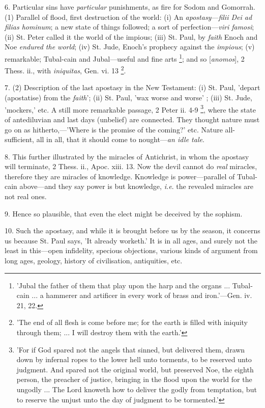 6. Particular sins have \emph{particular}
punishments, as fire for Sodom and Gomorrah. (1) Parallel of flood,
first destruction of the world: (i) An \emph{apostasy}—\emph{filii Dei
ad filias hominum}; a new state of things followed; a sort of
perfection—\emph{viri famosi}; (ii) St. Peter called it the world of
the impious; (iii) St. Paul, by \emph{faith} Enoch and Noe \emph{endured
the world}; (iv) St. Jude, Enoch's prophecy against the \emph{impious};
(v) remarkable; Tubal-cain and Jubal—useful and fine arts \footnote{'Jubal the father of
them that play upon the harp and the organs ... Tubal-cain ... a
hammerer and artificer in every work of brass and iron.'—Gen. iv.
21, 22.}; and so [\emph{anomos}], 2 Thess. ii., with \emph{iniquitas},
Gen. vi. 13 \footnote{'The end of all flesh is
come before me; for the earth is filled with iniquity through them;
... I will destroy them with the earth.'}.

7. (2) Description of the last apostasy in the
New Testament: (i) St. Paul, 'depart (apostatise) from the \emph{faith}';
(ii) St. Paul, 'wax worse and worse' ; (iii) St. Jude, 'mockers,' etc.
A still more remarkable passage, 2 Peter ii. 4-9 \footnote{'For if God spared not
the angels that sinned, but delivered them, drawn down by infernal
ropes to the lower hell unto torments, to be reserved unto judgment.
And spared not the original world, but preserved Noe, the eighth
person, the preacher of justice, bringing in the flood upon the world
for the ungodly ... The Lord knoweth how to deliver the godly from
temptation, but to reserve the unjust unto the day of judgment to be
tormented.'}, where the state of antediluvian and last days (unbelief) are
connected. They thought nature must go on as hitherto,—'Where is the
promise of the coming?' etc. Nature all-sufficient, all in all, that
it should come to nought—\emph{an idle tale}.

8. This further illustrated by the miracles of
Antichrist, in whom the apostasy will terminate, 2 Thess. ii., Apoc.
xiii. 13. Now the devil cannot do \emph{real} miracles, therefore they
are miracles of knowledge. Knowledge is power—parallel of Tubal-cain
above—and they say power is but knowledge, \emph{i.e}. the revealed
miracles are not real ones.

9. Hence so plausible, that even the elect might
be deceived by the sophism.

10. Such the apostasy, and while it is brought
before us by the season, it concerns us because St. Paul says, 'It
already worketh.' It is in all ages, and surely not the least in
this—open infidelity, specious objections, various kinds of argument
from long ages, geology, history of civilisation, antiquities, etc.

